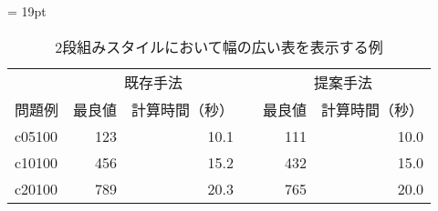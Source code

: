 \begin{table*}
 \centering
 \tabcolsep = 19pt
 \renewcommand{\arraystretch}{0.8}
 \caption{2段組みスタイルにおいて幅の広い表を表示する例}
 \label{table2}
 \begin{tabular}{lrrcrr} \hline
  &\multicolumn{2}{c}{既存手法} && \multicolumn{2}{c}{提案手法}\\ \cline{2-3} \cline{5-6}

  問題例 & 最良値 & 計算時間（秒）&& 最良値 & 計算時間（秒） \\ \hline
  c05100 &    123 &          10.1 &&    111 &          10.0 \\
  c10100 &    456 &          15.2 &&    432 &          15.0 \\
  c20100 &    789 &          20.3 &&    765 &          20.0 \\ \hline
 \end{tabular}
\end{table*}

